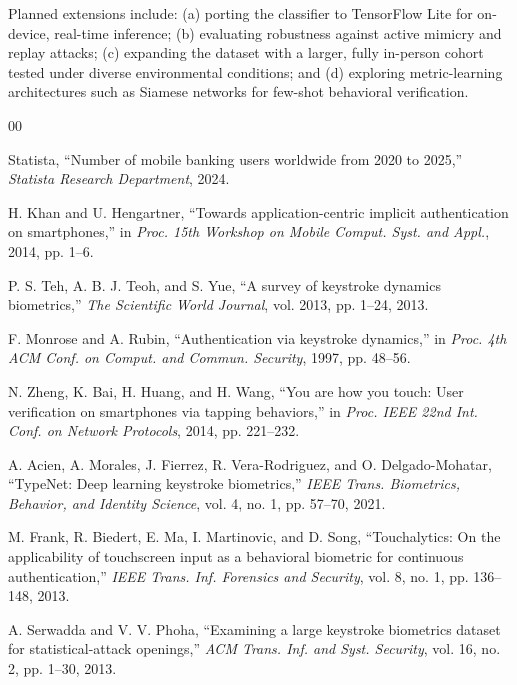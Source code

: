\documentclass[conference]{IEEEtran}
\begin{document}
Planned extensions include: (a) porting the classifier to TensorFlow Lite for on-device, real-time inference; (b) evaluating robustness against active mimicry and replay attacks; (c) expanding the dataset with a larger, fully in-person cohort tested under diverse environmental conditions; and (d) exploring metric-learning architectures such as Siamese networks for few-shot behavioral verification.

\begin{thebibliography}{00}

Statista, ``Number of mobile banking users worldwide from 2020 to 2025,'' \textit{Statista Research Department}, 2024.

H. Khan and U. Hengartner, ``Towards application-centric implicit authentication on smartphones,'' in \textit{Proc. 15th Workshop on Mobile Comput. Syst. and Appl.}, 2014, pp. 1--6.

P. S. Teh, A. B. J. Teoh, and S. Yue, ``A survey of keystroke dynamics biometrics,'' \textit{The Scientific World Journal}, vol. 2013, pp. 1--24, 2013.

F. Monrose and A. Rubin, ``Authentication via keystroke dynamics,'' in \textit{Proc. 4th ACM Conf. on Comput. and Commun. Security}, 1997, pp. 48--56.

N. Zheng, K. Bai, H. Huang, and H. Wang, ``You are how you touch: User verification on smartphones via tapping behaviors,'' in \textit{Proc. IEEE 22nd Int. Conf. on Network Protocols}, 2014, pp. 221--232.

A. Acien, A. Morales, J. Fierrez, R. Vera-Rodriguez, and O. Delgado-Mohatar, ``TypeNet: Deep learning keystroke biometrics,'' \textit{IEEE Trans. Biometrics, Behavior, and Identity Science}, vol. 4, no. 1, pp. 57--70, 2021.

M. Frank, R. Biedert, E. Ma, I. Martinovic, and D. Song, ``Touchalytics: On the applicability of touchscreen input as a behavioral biometric for continuous authentication,'' \textit{IEEE Trans. Inf. Forensics and Security}, vol. 8, no. 1, pp. 136--148, 2013.

A. Serwadda and V. V. Phoha, ``Examining a large keystroke biometrics dataset for statistical-attack openings,'' \textit{ACM Trans. Inf. and Syst. Security}, vol. 16, no. 2, pp. 1--30, 2013.


\end{thebibliography}
\end{document}
